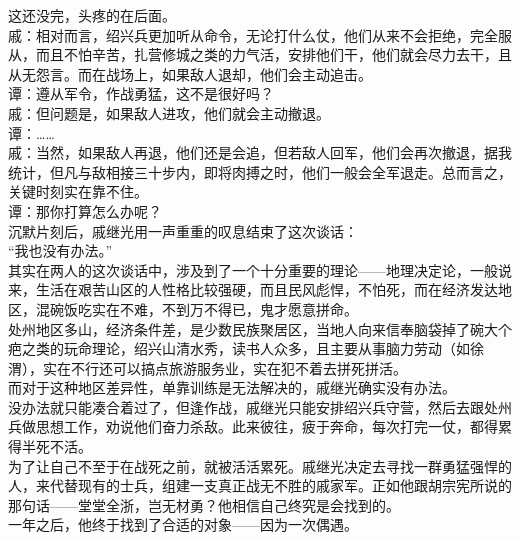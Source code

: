 \begin{multicols}{\theparacolNo}
这还没完，头疼的在后面。\\

戚：相对而言，绍兴兵更加听从命令，无论打什么仗，他们从来不会拒绝，完全服从，而且不怕辛苦，扎营修城之类的力气活，安排他们干，他们就会尽力去干，且从无怨言。而在战场上，如果敌人退却，他们会主动追击。\\

谭：遵从军令，作战勇猛，这不是很好吗？\\

戚：但问题是，如果敌人进攻，他们就会主动撤退。\\

谭：……\\

戚：当然，如果敌人再退，他们还是会追，但若敌人回军，他们会再次撤退，据我统计，但凡与敌相接三十步内，即将肉搏之时，他们一般会全军退走。总而言之，关键时刻实在靠不住。\\

谭：那你打算怎么办呢？\\

沉默片刻后，戚继光用一声重重的叹息结束了这次谈话：\\

“我也没有办法。”\\

其实在两人的这次谈话中，涉及到了一个十分重要的理论——地理决定论，一般说来，生活在艰苦山区的人性格比较强硬，而且民风彪悍，不怕死，而在经济发达地区，混碗饭吃实在不难，不到万不得已，鬼才愿意拼命。\\

处州地区多山，经济条件差，是少数民族聚居区，当地人向来信奉脑袋掉了碗大个疤之类的玩命理论，绍兴山清水秀，读书人众多，且主要从事脑力劳动（如徐渭），实在不行还可以搞点旅游服务业，实在犯不着去拼死拼活。\\

而对于这种地区差异性，单靠训练是无法解决的，戚继光确实没有办法。\\

没办法就只能凑合着过了，但逢作战，戚继光只能安排绍兴兵守营，然后去跟处州兵做思想工作，劝说他们奋力杀敌。此来彼往，疲于奔命，每次打完一仗，都得累得半死不活。\\

为了让自己不至于在战死之前，就被活活累死。戚继光决定去寻找一群勇猛强悍的人，来代替现有的士兵，组建一支真正战无不胜的戚家军。正如他跟胡宗宪所说的那句话——堂堂全浙，岂无材勇？他相信自己终究是会找到的。\\

一年之后，他终于找到了合适的对象——因为一次偶遇。\\


\end{multicols}

